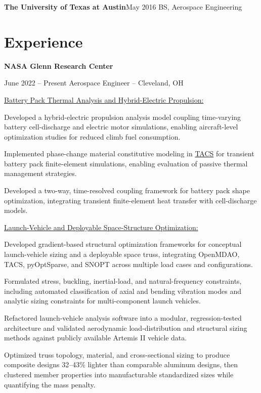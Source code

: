 \begin{threecolentry}{\textbf{The University of Texas at Austin}}{May 2016}
    BS, Aerospace Engineering
\end{threecolentry}

\section{Experience}
\textbf{NASA Glenn Research Center}
\begin{twocolentry}{June 2022 -- Present}
    Aerospace Engineer -- Cleveland, OH
\end{twocolentry}

\underline{Battery Pack Thermal Analysis and Hybrid-Electric Propulsion:}
\begin{onecolentry}
    \begin{highlights}
        \item Developed a hybrid-electric propulsion analysis model coupling time-varying battery cell-discharge and electric motor simulations, enabling aircraft-level optimization studies for reduced climb fuel consumption.
        \item Implemented phase-change material constitutive modeling in \href{https://github.com/smdogroup/tacs}{TACS} for transient battery pack finite-element simulations, enabling evaluation of passive thermal management strategies.
        \item Developed a two-way, time-resolved coupling framework for battery pack shape optimization, integrating transient finite-element heat transfer with cell-discharge models.
    \end{highlights}
\end{onecolentry}

\underline{Launch-Vehicle and Deployable Space-Structure Optimization:}
\begin{onecolentry}
    \begin{highlights}
        \item Developed gradient-based structural optimization frameworks for conceptual launch-vehicle sizing and a deployable space truss, integrating OpenMDAO, TACS, pyOptSparse, and SNOPT across multiple load cases and configurations.
        \item Formulated stress, buckling, inertial-load, and natural-frequency constraints, including automated classification of axial and bending vibration modes and analytic sizing constraints for multi-component launch vehicles.
        \item Refactored launch-vehicle analysis software into a modular, regression-tested architecture and validated aerodynamic load-distribution and structural sizing methods against publicly available Artemis II vehicle data.
        \item Optimized truss topology, material, and cross-sectional sizing to produce composite designs 32--43\% lighter than comparable aluminum designs, then clustered member properties into manufacturable standardized sizes while quantifying the mass penalty.
    \end{highlights}
\end{onecolentry}

